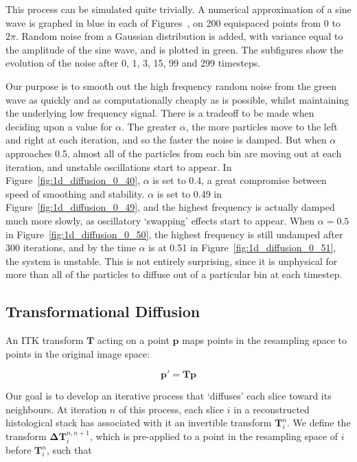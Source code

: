 	
	
	  This process can be simulated quite trivially. A numerical approximation of a sine wave is graphed in blue in each of Figures~, on 200 equispaced points from $0$ to $2\pi$. Random noise from a Gaussian distribution is added, with variance equal to the amplitude of the sine wave, and is plotted in green. The subfigures show the evolution of the noise after 0, 1, 3, 15, 99 and 299 timesteps.
  
	  Our purpose is to smooth out the high frequency random noise from the green wave as quickly and as computationally cheaply as is possible, whilst maintaining the underlying low frequency signal. There is a tradeoff to be made when deciding upon a value for $\alpha$. The greater $\alpha$, the more particles move to the left and right at each iteration, and so the faster the noise is damped. But when $\alpha$ approaches 0.5, almost all of the particles from each bin are moving out at each iteration, and unstable oscillations start to appear. In Figure~\ref{fig:1d_diffusion_0_40}, $\alpha$ is set to 0.4, a great compromise between speed of smoothing and stability. $\alpha$ is set to 0.49 in Figure~\ref{fig:1d_diffusion_0_49}, and the highest frequency is actually damped much more slowly, as oscillatory `swapping' effects start to appear. When $\alpha = 0.5$ in Figure~\ref{fig:1d_diffusion_0_50}, the highest frequency is still undamped after 300 iterations, and by the time $\alpha$ is at 0.51 in Figure~\ref{fig:1d_diffusion_0_51}, the system is unstable. This is not entirely surprising, since it is unphysical for more than all of the particles to diffuse out of a particular bin at each timestep.
		
	\subsection{Transformational Diffusion} %
	\label{sub:transformational_diffusion}
	  An ITK transform $\mathbf{T}$ acting on a point $\mathbf{p}$ maps points in the resampling space to points in the original image space:
		
		\begin{equation}
			\mathbf{p'} = \mathbf{Tp}
		\end{equation}
		
		Our goal is to develop an iterative process that `diffuses' each slice toward its neighbours. At iteration $n$ of this process, each slice $i$ in a reconstructed histological stack has associated with it an invertible transform $\mathbf{T}_i^n$. We define the transform $\mathbf{\Delta T}_i^{n,n+1}$, which is pre-applied to a point in the resampling space of $i$ before $\mathbf{T}_i^n$, such that
		
